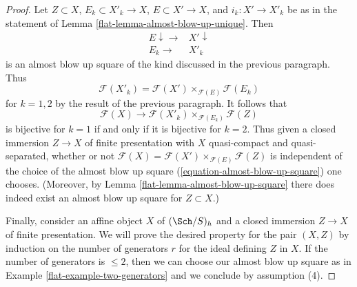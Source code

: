 \begin{proof}
\medskip\noindent
Let $Z \subset X$, $E_k \subset X'_k \to X$, $E \subset X' \to X$, and
$i_k : X' \to X'_k$ be as in the statement of
Lemma \ref{flat-lemma-almost-blow-up-unique}. Then
$$
\begin{array}{cc}E \downarrow\longrightarrow & X' \downarrow \\ E_k \longrightarrow & X'_k\end{array}
$$
is an almost blow up square of the kind discussed in the previous
paragraph. Thus
$$
\mathcal{F}(X'_k) = \mathcal{F}(X') \times_{\mathcal{F}(E)} \mathcal{F}(E_k)
$$
for $k = 1, 2$ by the result of the previous paragraph. It follows that
$$
\mathcal{F}(X) \longrightarrow
\mathcal{F}(X'_k) \times_{\mathcal{F}(E_k)} \mathcal{F}(Z)
$$
is bijective for $k = 1$ if and only if it is bijective for $k = 2$.
Thus given a closed immersion $Z \to X$ of finite presentation
with $X$ quasi-compact and quasi-separated, whether or not
$\mathcal{F}(X) = \mathcal{F}(X') \times_{\mathcal{F}(E)} \mathcal{F}(Z)$
is independent of the choice of the almost blow up square
(\ref{equation-almost-blow-up-square}) one chooses.
(Moreover, by Lemma \ref{flat-lemma-almost-blow-up-square}
there does indeed exist an almost
blow up square for $Z \subset X$.)

\medskip\noindent
Finally, consider an affine object $X$ of $(\Sch/S)_h$
and a closed immersion $Z \to X$ of finite presentation.
We will prove the desired property for the pair $(X, Z)$
by induction on the number of generators $r$ for the ideal
defining $Z$ in $X$. If the number of generators is $\leq 2$,
then we can choose our almost blow up square as
in Example \ref{flat-example-two-generators}
and we conclude by assumption (4).


\end{proof}
